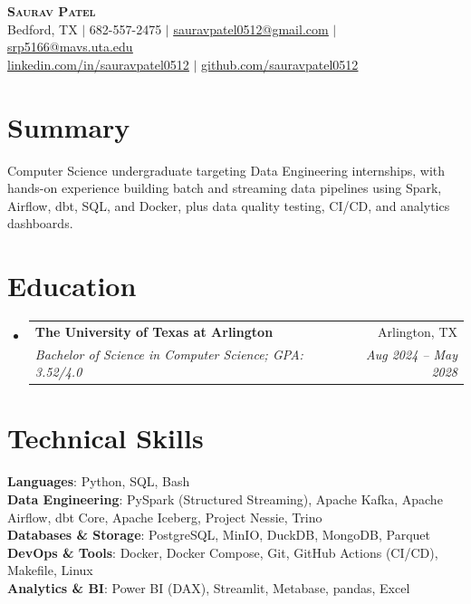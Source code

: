 \documentclass[letterpaper,11pt]{article}
\makeatletter
\newcommand{\resumeSubheading}[4]{
  \vspace{-2pt}\item
    \begin{tabular*}{0.97\textwidth}[t]{l@{\extracolsep{\fill}}r}
      \textbf{#1} & #2 \\
      \textit{\small#3} & \textit{\small #4} \\
    \end{tabular*}\vspace{-7pt}
}
\newcommand{\resumeSubHeadingListStart}{\begin{itemize}[leftmargin=0.15in, label={}]}
\newcommand{\resumeSubHeadingListEnd}{\end{itemize}}
\makeatother
\begin{document}
\begin{center}
    \textbf{\Huge \scshape Saurav Patel} \\ \vspace{1pt}
    \small Bedford, TX $|$
    \small 682-557-2475 $|$
    \href{mailto:sauravpatel0512@gmail.com}{\underline{sauravpatel0512@gmail.com}} $|$
    \href{mailto:srp5166@mavs.uta.edu}{\underline{srp5166@mavs.uta.edu}} \\
    \href{https://linkedin.com/in/sauravpatel0512}{\underline{linkedin.com/in/sauravpatel0512}} $|$
    \href{https://github.com/sauravpatel0512}{\underline{github.com/sauravpatel0512}}
\end{center}

\section{Summary}
Computer Science undergraduate targeting Data Engineering internships, with hands-on experience building batch and streaming data pipelines using Spark, Airflow, dbt, SQL, and Docker, plus data quality testing, CI/CD, and analytics dashboards.

\section{Education}
  \resumeSubHeadingListStart
    \resumeSubheading
      {The University of Texas at Arlington}{Arlington, TX}
      {Bachelor of Science in Computer Science; GPA: 3.52/4.0}{Aug 2024 -- May 2028}
  \resumeSubHeadingListEnd

\section{Technical Skills}
 \begin{itemize}[leftmargin=0.15in, label={}]
    \small{\item{
     \textbf{Languages}{: Python, SQL, Bash} \\
     \textbf{Data Engineering}{: PySpark (Structured Streaming), Apache Kafka, Apache Airflow, dbt Core, Apache Iceberg, Project Nessie, Trino} \\
     \textbf{Databases \& Storage}{: PostgreSQL, MinIO, DuckDB, MongoDB, Parquet} \\
     \textbf{DevOps \& Tools}{: Docker, Docker Compose, Git, GitHub Actions (CI/CD), Makefile, Linux} \\
     \textbf{Analytics \& BI}{: Power BI (DAX), Streamlit, Metabase, pandas, Excel}
    }}
 \end{itemize}
\end{document}
